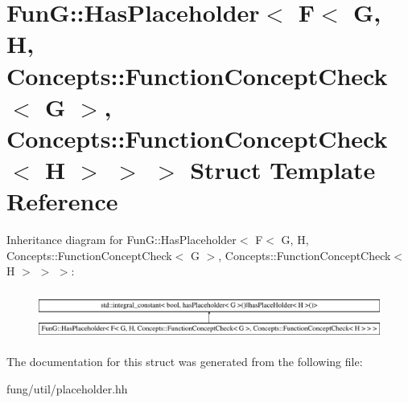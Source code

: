 \hypertarget{structFunG_1_1HasPlaceholder_3_01F_3_01G_00_01H_00_01Concepts_1_1FunctionConceptCheck_3_01G_01_4cd7b7d4e6817890676c8622deb2d76ee}{\section{Fun\-G\-:\-:Has\-Placeholder$<$ F$<$ G, H, Concepts\-:\-:Function\-Concept\-Check$<$ G $>$, Concepts\-:\-:Function\-Concept\-Check$<$ H $>$ $>$ $>$ Struct Template Reference}
\label{structFunG_1_1HasPlaceholder_3_01F_3_01G_00_01H_00_01Concepts_1_1FunctionConceptCheck_3_01G_01_4cd7b7d4e6817890676c8622deb2d76ee}
}
Inheritance diagram for Fun\-G\-:\-:Has\-Placeholder$<$ F$<$ G, H, Concepts\-:\-:Function\-Concept\-Check$<$ G $>$, Concepts\-:\-:Function\-Concept\-Check$<$ H $>$ $>$ $>$\-:\begin{figure}[H]
\begin{center}
\leavevmode
\includegraphics[height=1.609195cm]{structFunG_1_1HasPlaceholder_3_01F_3_01G_00_01H_00_01Concepts_1_1FunctionConceptCheck_3_01G_01_4cd7b7d4e6817890676c8622deb2d76ee}
\end{center}
\end{figure}


The documentation for this struct was generated from the following file\-:\begin{DoxyCompactItemize}
\item 
fung/util/placeholder.\-hh\end{DoxyCompactItemize}

